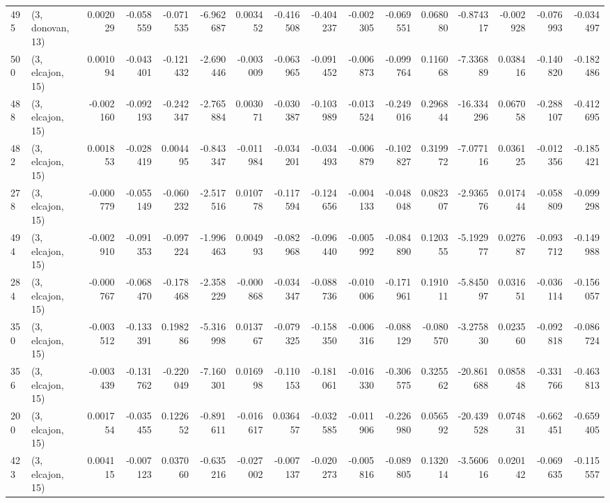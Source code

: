 \begin{tabular}{llrrrrrrrrrrrrrr}
495 &  (3, donovan, 13) &   0.002029 & -0.058559 & -0.071535 &   -6.962687 &  0.003452 &  -0.416508 &  -0.404237 & -0.002305 & -0.069551 &  0.068080 &   -0.874317 & -0.002928 &  -0.076993 &  -0.034497 \\
500 &  (3, elcajon, 15) &   0.001094 & -0.043401 & -0.121432 &   -2.690446 & -0.003009 &  -0.063965 &  -0.091452 & -0.006873 & -0.099764 &  0.116068 &   -7.336889 &  0.038416 &  -0.140820 &  -0.182486 \\
488 &  (3, elcajon, 15) &  -0.002160 & -0.092193 & -0.242347 &   -2.765884 &  0.003071 &  -0.030387 &  -0.103989 & -0.013524 & -0.249016 &  0.296844 &  -16.334296 &  0.067058 &  -0.288107 &  -0.412695 \\
482 &  (3, elcajon, 15) &   0.001853 & -0.028419 &  0.004495 &   -0.843347 & -0.011984 &  -0.034201 &  -0.034493 & -0.006879 & -0.102827 &  0.319972 &   -7.077116 &  0.036125 &  -0.012356 &  -0.185421 \\
278 &  (3, elcajon, 15) &  -0.000779 & -0.055149 & -0.060232 &   -2.517516 &  0.010778 &  -0.117594 &  -0.124656 & -0.004133 & -0.048048 &  0.082307 &   -2.936576 &  0.017444 &  -0.058809 &  -0.099298 \\
494 &  (3, elcajon, 15) &  -0.002910 & -0.091353 & -0.097224 &   -1.996463 &  0.004993 &  -0.082968 &  -0.096440 & -0.005992 & -0.084890 &  0.120355 &   -5.192977 &  0.027687 &  -0.093712 &  -0.149988 \\
284 &  (3, elcajon, 15) &  -0.000767 & -0.068470 & -0.178468 &   -2.358229 & -0.000868 &  -0.034347 &  -0.088736 & -0.010006 & -0.171961 &  0.191011 &   -5.845097 &  0.031651 &  -0.036114 &  -0.156057 \\
350 &  (3, elcajon, 15) &  -0.003512 & -0.133391 &  0.198286 &   -5.316998 &  0.013767 &  -0.079325 &  -0.158350 & -0.006316 & -0.088129 & -0.080570 &   -3.275830 &  0.023560 &  -0.092818 &  -0.086724 \\
356 &  (3, elcajon, 15) &  -0.003439 & -0.131762 & -0.220049 &   -7.160301 &  0.016998 &  -0.110153 &  -0.181061 & -0.016330 & -0.306575 &  0.325562 &  -20.861688 &  0.085848 &  -0.331766 &  -0.463813 \\
200 &  (3, elcajon, 15) &   0.001754 & -0.035455 &  0.122652 &   -0.891611 & -0.016617 &   0.036457 &  -0.032585 & -0.011906 & -0.226980 &  0.056592 &  -20.439528 &  0.074831 &  -0.662451 &  -0.659405 \\
423 &  (3, elcajon, 15) &   0.004115 & -0.007123 &  0.037060 &   -0.635216 & -0.027002 &  -0.007137 &  -0.020273 & -0.005816 & -0.089805 &  0.132014 &   -3.560616 &  0.020142 &  -0.069635 &  -0.115557 \\

\end{tabular}
